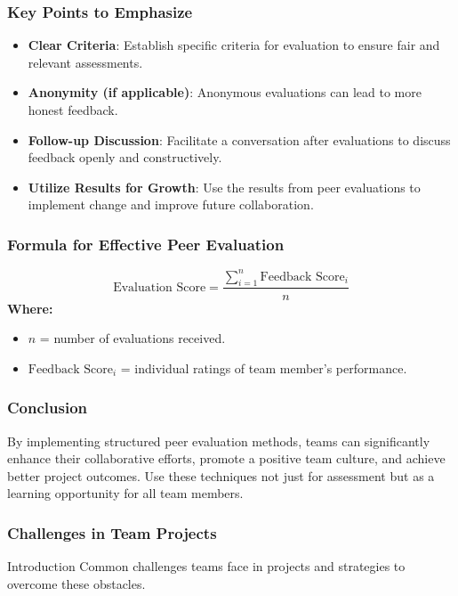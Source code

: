 \documentclass[aspectratio=169]{beamer}
\begin{document}
\begin{frame}[fragile]
    \frametitle{Key Points to Emphasize}
    \begin{itemize}
        \item \textbf{Clear Criteria}: Establish specific criteria for evaluation to ensure fair and relevant assessments.
        \item \textbf{Anonymity (if applicable)}: Anonymous evaluations can lead to more honest feedback.
        \item \textbf{Follow-up Discussion}: Facilitate a conversation after evaluations to discuss feedback openly and constructively.
        \item \textbf{Utilize Results for Growth}: Use the results from peer evaluations to implement change and improve future collaboration.
    \end{itemize}
\end{frame}

\begin{frame}[fragile]
    \frametitle{Formula for Effective Peer Evaluation}
    \begin{equation}
    \text{Evaluation Score} = \frac{\sum_{i=1}^{n} \text{Feedback Score}_i}{n}
    \end{equation}
    \textbf{Where:}
    \begin{itemize}
        \item \( n \) = number of evaluations received.
        \item \( \text{Feedback Score}_i \) = individual ratings of team member's performance.
    \end{itemize}
\end{frame}

\begin{frame}[fragile]
    \frametitle{Conclusion}
    By implementing structured peer evaluation methods, teams can significantly enhance their collaborative efforts, promote a positive team culture, and achieve better project outcomes. Use these techniques not just for assessment but as a learning opportunity for all team members.
\end{frame}

\begin{frame}[fragile]
    \frametitle{Challenges in Team Projects}
    \begin{block}{Introduction}
        Common challenges teams face in projects and strategies to overcome these obstacles.
    \end{block}
\end{frame}
\end{document}

